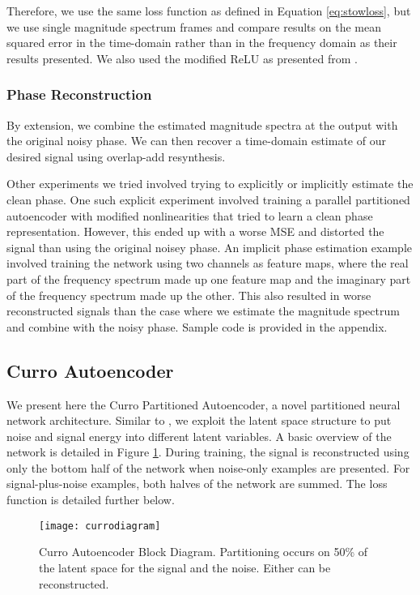 Therefore, we use the same loss function as defined in Equation \ref{eq:stowloss}, but we use single magnitude spectrum frames and compare results on the mean squared error in the time-domain rather than in the frequency domain as their results presented. We also used the modified ReLU as presented from \cite{liu2014experiments}.

\subsubsection{Phase Reconstruction}

By extension, we combine the estimated magnitude spectra at the output with the original noisy phase. We can then recover a time-domain estimate of our desired signal using overlap-add resynthesis.

Other experiments we tried involved trying to explicitly or implicitly estimate the clean phase. One such explicit experiment involved training a parallel partitioned autoencoder with modified nonlinearities that tried to learn a clean phase representation. However, this ended up with a worse MSE and distorted the signal than using the original noisey phase. An implicit phase estimation example involved training the network using two channels as feature maps, where the real part of the frequency spectrum made up one feature map and the imaginary part of the frequency spectrum made up the other. This also resulted in worse reconstructed signals than the case where we estimate the magnitude spectrum and combine with the noisy phase. Sample code is provided in the appendix.

\subsection{Curro Autoencoder}

We present here the Curro Partitioned Autoencoder, a novel partitioned neural network architecture. Similar to \cite{stow}, we exploit the latent space structure to put noise and signal energy into different latent variables. A basic overview of the network is detailed in Figure \ref{fig:currodiagram}. During training, the signal is reconstructed using only the bottom half of the network when noise-only examples are presented. For signal-plus-noise examples, both halves of the network are summed. The loss function is detailed further below.

\begin{figure}[!ht]
\centering
\texttt{[image: currodiagram]}
\caption[Curro Autoencoder Block Diagram]{Curro Autoencoder Block Diagram. Partitioning occurs on 50\% of the latent space for the signal and the noise. Either can be reconstructed.}
\label{fig:currodiagram}
\end{figure}

